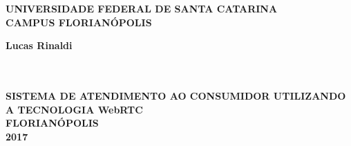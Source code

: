 \thispagestyle{empty}

\vfill
 \begin{center}
    
	
    {\large\bfseries UNIVERSIDADE FEDERAL DE SANTA CATARINA} \\
    
   
    {\large\bfseries CAMPUS FLORIANÓPOLIS}  \\ 

    \vspace*{1in}
    \begin{large} \bfseries Lucas Rinaldi \end{large}\\[0.4in]

    \vspace*{4cm}
    \noindent \\
    
    \large\bfseries{SISTEMA DE ATENDIMENTO AO CONSUMIDOR UTILIZANDO A TECNOLOGIA WebRTC} \\
    \vfill
    \large\bfseries{FLORIANÓPOLIS \\ 2017}
\end{center}

\normalsize


